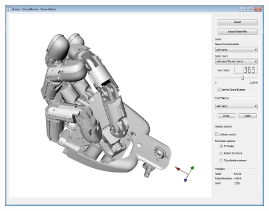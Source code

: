 \documentclass{book}
\begin{document}
\begin{figure}[H]
	\centering
	\begin{minipage} {.45\linewidth}
	  \includegraphics[width=\linewidth]{Tutorial9c}
	\end{minipage}
\end{figure}
\par
\end{document}
